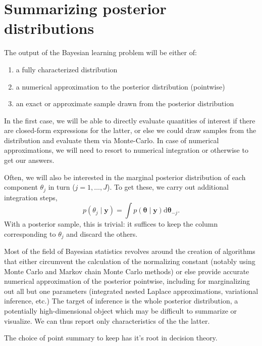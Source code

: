 \documentclass[
  11pt,
  letterpaper,
]{scrbook}
\providecommand{\tightlist}{%
  \setlength{\itemsep}{0pt}\setlength{\parskip}{0pt}}
\theoremstyle{definition}
\theoremstyle{plain}
\theoremstyle{plain}
\theoremstyle{plain}
\theoremstyle{definition}
\theoremstyle{definition}
\theoremstyle{plain}
\theoremstyle{plain}
\theoremstyle{remark}
\begin{document}
\section{Summarizing posterior
distributions}\label{summarizing-posterior-distributions}

The output of the Bayesian learning problem will be either of:

\begin{enumerate}
\def\labelenumi{\arabic{enumi}.}
\tightlist
\item
  a fully characterized distribution
\item
  a numerical approximation to the posterior distribution (pointwise)
\item
  an exact or approximate sample drawn from the posterior distribution
\end{enumerate}

In the first case, we will be able to directly evaluate quantities of
interest if there are closed-form expressions for the latter, or else we
could draw samples from the distribution and evaluate them via
Monte-Carlo. In case of numerical approximations, we will need to resort
to numerical integration or otherwise to get our answers.

Often, we will also be interested in the marginal posterior distribution
of each component \(\theta_j\) in turn (\(j=1, \ldots, J\)). To get
these, we carry out additional integration steps,
\[p(\theta_j \mid \boldsymbol{y}) = \int p(\boldsymbol{\theta} \mid \boldsymbol{y}) \mathrm{d} \boldsymbol{\theta}_{-j}.\]
With a posterior sample, this is trivial: it suffices to keep the column
corresponding to \(\theta_j\) and discard the others.

Most of the field of Bayesian statistics revolves around the creation of
algorithms that either circumvent the calculation of the normalizing
constant (notably using Monte Carlo and Markov chain Monte Carlo
methods) or else provide accurate numerical approximation of the
posterior pointwise, including for marginalizing out all but one
parameters (integrated nested Laplace approximations, variational
inference, etc.) The target of inference is the whole posterior
distribution, a potentially high-dimensional object which may be
difficult to summarize or visualize. We can thus report only
characteristics of the the latter.

The choice of point summary to keep has it's root in decision theory.
\end{document}
